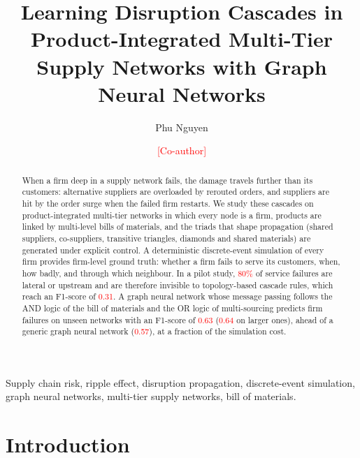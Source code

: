 \documentclass{ifacconf}
\newcommand{\pilot}[1]{\textcolor{red}{#1}}   %
\newcommand{\todo}[1]{\textcolor{red}{[#1]}}
\begin{document}
\begin{frontmatter}

\title{Learning Disruption Cascades in Product-Integrated Multi-Tier Supply Networks with Graph Neural Networks}

\author[First]{Phu Nguyen}
\author[Second]{\todo{Co-author}}

\address[First]{\todo{Affiliation, address} (e-mail: \todo{e-mail}).}
\address[Second]{\todo{Affiliation, address} (e-mail: \todo{e-mail}).}

\begin{abstract}
When a firm deep in a supply network fails, the damage travels further than its customers: alternative suppliers are overloaded by rerouted orders, and suppliers are hit by the order surge when the failed firm restarts. We study these cascades on product-integrated multi-tier networks in which every node is a firm, products are linked by multi-level bills of materials, and the triads that shape propagation (shared suppliers, co-suppliers, transitive triangles, diamonds and shared materials) are generated under explicit control. A deterministic discrete-event simulation of every firm provides firm-level ground truth: whether a firm fails to serve its customers, when, how badly, and through which neighbour. In a pilot study, \pilot{80\%} of service failures are lateral or upstream and are therefore invisible to topology-based cascade rules, which reach an F1-score of \pilot{0.31}. A graph neural network whose message passing follows the AND logic of the bill of materials and the OR logic of multi-sourcing predicts firm failures on unseen networks with an F1-score of \pilot{0.63} (\pilot{0.64} on larger ones), ahead of a generic graph neural network (\pilot{0.57}), at a fraction of the simulation cost.
\end{abstract}

\begin{keyword}
Supply chain risk, ripple effect, disruption propagation, discrete-event simulation, graph neural networks, multi-tier supply networks, bill of materials.
\end{keyword}

\end{frontmatter}

\section{Introduction}
\end{document}
